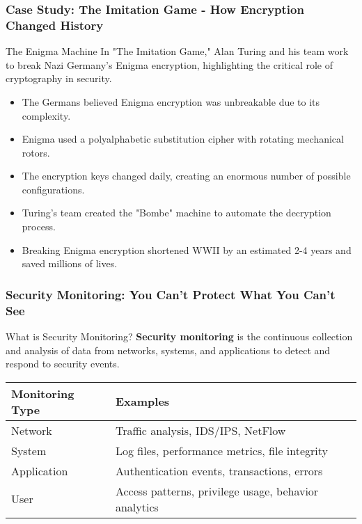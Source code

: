 \documentclass{beamer}
\begin{document}
    \begin{frame}
    \frametitle{Case Study: The Imitation Game - How Encryption Changed History}
    
    \begin{exampleblock}{The Enigma Machine}
    In "The Imitation Game," Alan Turing and his team work to break Nazi Germany's Enigma encryption, highlighting the critical role of cryptography in security.
    \end{exampleblock}
    
    \begin{itemize}
    \item The Germans believed Enigma encryption was unbreakable due to its complexity.
    \item Enigma used a polyalphabetic substitution cipher with rotating mechanical rotors.
    \item The encryption keys changed daily, creating an enormous number of possible configurations.
    \item Turing's team created the "Bombe" machine to automate the decryption process.
    \item Breaking Enigma encryption shortened WWII by an estimated 2-4 years and saved millions of lives.
    \end{itemize}
    
    \end{frame}
    
    \begin{frame}
    \frametitle{Security Monitoring: You Can't Protect What You Can't See}
    
    \begin{block}{What is Security Monitoring?}
    \textbf{Security monitoring} is the continuous collection and analysis of data from networks, systems, and applications to detect and respond to security events.
    \end{block}

    \begin{table}
    \begin{tabularx}{\textwidth}{|l|X|}
    \hline
    \textbf{Monitoring Type} & \textbf{Examples} \\
    \hline
    Network & Traffic analysis, IDS/IPS, NetFlow \\
    \hline
    System & Log files, performance metrics, file integrity \\
    \hline
    Application & Authentication events, transactions, errors \\
    \hline
    User & Access patterns, privilege usage, behavior analytics \\
    \hline
    \end{tabularx}
    \end{table}
    \end{frame}
\end{document}
